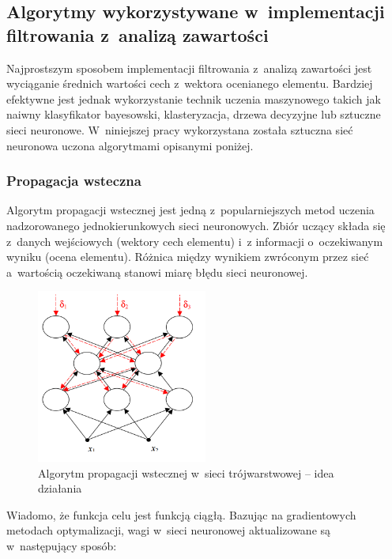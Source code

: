 \documentclass[twoside]{iisthesis}
\begin{document}
	 \subsection{Algorytmy wykorzystywane w~implementacji filtrowania z~analizą zawartości}
	 
	 Najprostszym sposobem implementacji filtrowania z~analizą zawartości jest wyciąganie średnich wartości cech z~wektora ocenianego elementu. Bardziej efektywne jest jednak wykorzystanie technik uczenia maszynowego takich jak naiwny klasyfikator bayesowski, klasteryzacja, drzewa decyzyjne lub sztuczne sieci neuronowe. W~niniejszej pracy wykorzystana została sztuczna sieć neuronowa uczona algorytmami opisanymi poniżej. 
	 
	 \subsubsection{Propagacja wsteczna}
	 \label{sss:backprop}
	 
	 Algorytm propagacji wstecznej jest jedną z~popularniejszych metod uczenia nadzorowanego jednokierunkowych sieci neuronowych. Zbiór uczący składa się z~danych wejściowych (wektory cech elementu) i~z informacji o~oczekiwanym wyniku (ocena elementu). Różnica między wynikiem zwróconym przez sieć a~wartością oczekiwaną stanowi miarę błędu sieci neuronowej. 
	 
	 \begin{figure}[!ht] 
			 	\centering
			 	\includegraphics[width=0.5\textwidth]{ilustracjabackprop}
			 	\caption{Algorytm propagacji wstecznej w~sieci trójwarstwowej -- idea działania \protect\cite{kwateralgorytmy}}
			 	\label{fig:ilustracjabackprop}
	 \end{figure}
	 
	 Wiadomo, że funkcja celu jest funkcją ciągłą. Bazując na gradientowych metodach optymalizacji, wagi w~sieci neuronowej aktualizowane są w~następujący sposób:	 
	 
\end{document}

